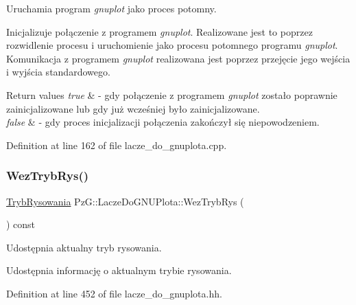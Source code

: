 Uruchamia program {\itshape gnuplot} jako proces potomny. 

Inicjalizuje połączenie z programem {\itshape gnuplot}. Realizowane jest to poprzez rozwidlenie procesu i uruchomienie jako procesu potomnego programu {\itshape gnuplot}. Komunikacja z programem {\itshape gnuplot} realizowana jest poprzez przejęcie jego wejścia i wyjścia standardowego.


\begin{DoxyRetVals}{Return values}
{\em true} & -\/ gdy połączenie z programem {\itshape gnuplot} zostało poprawnie zainicjalizowane lub gdy już wcześniej było zainicjalizowane. \\
\hline
{\em false} & -\/ gdy proces inicjalizacji połączenia zakończył się niepowodzeniem. \\
\hline
\end{DoxyRetVals}


Definition at line 162 of file lacze\+\_\+do\+\_\+gnuplota.\+cpp.

\mbox{\label{class_pz_g_1_1_lacze_do_g_n_u_plota_a7c417f27b4b112f58a5be3ce6ea8d1fe}} 
\subsubsection{\texorpdfstring{Wez\+Tryb\+Rys()}{WezTrybRys()}}
{\footnotesize\ttfamily \hyperlink{namespace_pz_g_aeedae1ef10c66d720f9e89de408ca4ca}{Tryb\+Rysowania} Pz\+G\+::\+Lacze\+Do\+G\+N\+U\+Plota\+::\+Wez\+Tryb\+Rys (\begin{DoxyParamCaption}{ }\end{DoxyParamCaption}) const\hspace{0.3cm}{\ttfamily [inline]}}



Udostępnia aktualny tryb rysowania. 

Udostępnia informację o aktualnym trybie rysowania. 

Definition at line 452 of file lacze\+\_\+do\+\_\+gnuplota.\+hh.

\mbox{\label{class_pz_g_1_1_lacze_do_g_n_u_plota_a4531e6d166faf2e2c8bb4a54a9c9e1f8}} 
